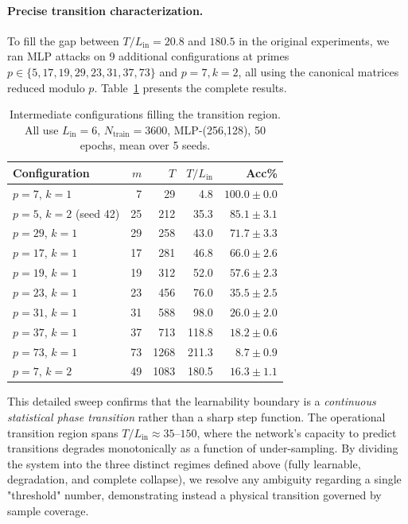 \documentclass[11pt]{article}
\theoremstyle{plain}
\theoremstyle{definition}
\begin{document}
\paragraph{Precise transition characterization.} To fill the gap between $T/L_{\mathrm{in}}=20.8$ and $180.5$ in the original experiments, we ran MLP attacks on 9 additional configurations at primes $p \in \{5,17,19,29,23,31,37,73\}$ and $p=7,k=2$, all using the canonical matrices reduced modulo $p$. Table~\ref{tab:intermediate} presents the complete results.

\begin{table}[ht]
\centering
\caption{Intermediate configurations filling the transition region. All use $L_{\mathrm{in}}=6$, $N_{\mathrm{train}}=3600$, MLP-(256,128), 50 epochs, mean over 5 seeds.}
\label{tab:intermediate}
\begin{tabular}{lrrrr}
\toprule
Configuration & $m$ & $T$ & $T/L_{\mathrm{in}}$ & Acc\%\\
\midrule
$p=7$, $k=1$ & 7 & 29 & 4.8 & $100.0 \pm 0.0$\\
$p=5$, $k=2$ (seed 42) & 25 & 212 & 35.3 & $85.1 \pm 3.1$\\
$p=29$, $k=1$ & 29 & 258 & 43.0 & $71.7 \pm 3.3$\\
$p=17$, $k=1$ & 17 & 281 & 46.8 & $66.0 \pm 2.6$\\
$p=19$, $k=1$ & 19 & 312 & 52.0 & $57.6 \pm 2.3$\\
$p=23$, $k=1$ & 23 & 456 & 76.0 & $35.5 \pm 2.5$\\
$p=31$, $k=1$ & 31 & 588 & 98.0 & $26.0 \pm 2.0$\\
$p=37$, $k=1$ & 37 & 713 & 118.8 & $18.2 \pm 0.6$\\
$p=73$, $k=1$ & 73 & 1268 & 211.3 & $8.7 \pm 0.9$\\
$p=7$, $k=2$ & 49 & 1083 & 180.5 & $16.3 \pm 1.1$\\
\bottomrule
\end{tabular}
\end{table}

This detailed sweep confirms that the learnability boundary is a \emph{continuous statistical phase transition} rather than a sharp step function. The operational transition region spans $T/L_{\mathrm{in}} \approx 35$--$150$, where the network's capacity to predict transitions degrades monotonically as a function of under-sampling. By dividing the system into the three distinct regimes defined above (fully learnable, degradation, and complete collapse), we resolve any ambiguity regarding a single "threshold" number, demonstrating instead a physical transition governed by sample coverage.
\end{document}
